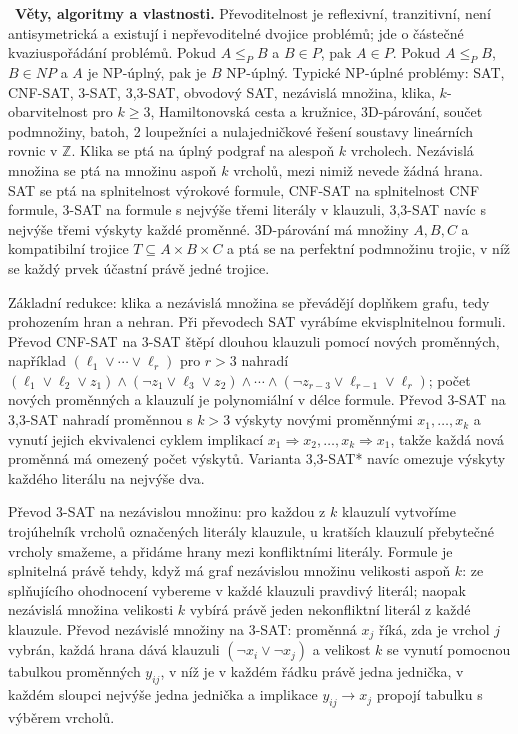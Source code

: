 \begin{odpoved}
\noindent{}\ \textbf{Věty, algoritmy a vlastnosti.}
Převoditelnost je reflexivní, tranzitivní, není antisymetrická a existují i
nepřevoditelné dvojice problémů; jde o částečné kvaziuspořádání problémů. Pokud
$A\le_P B$ a $B\in P$, pak $A\in P$. Pokud $A\le_P B$, $B\in NP$ a $A$ je NP-úplný,
pak je $B$ NP-úplný. Typické NP-úplné problémy: SAT, CNF-SAT, 3-SAT, 3,3-SAT,
obvodový SAT, nezávislá množina, klika, $k$-obarvitelnost pro $k\ge3$, Hamiltonovská
cesta a kružnice, 3D-párování, součet podmnožiny, batoh, 2 loupežníci a nulajedničkové
řešení soustavy lineárních rovnic v $\mathbb Z$. Klika se ptá na úplný podgraf na
alespoň $k$ vrcholech. Nezávislá množina se ptá na množinu aspoň $k$ vrcholů, mezi
nimiž nevede žádná hrana. SAT se ptá na splnitelnost výrokové formule, CNF-SAT na splnitelnost CNF formule, 3-SAT na formule s
nejvýše třemi literály v klauzuli, 3,3-SAT navíc s nejvýše třemi výskyty každé proměnné.
3D-párování má množiny $A,B,C$ a kompatibilní trojice $T\subseteq A\times B\times C$ a
ptá se na perfektní podmnožinu trojic, v níž se každý prvek účastní právě jedné trojice.

Základní redukce: klika a nezávislá množina se převádějí doplňkem grafu, tedy prohozením
hran a nehran. Při převodech SAT vyrábíme ekvisplnitelnou formuli. Převod CNF-SAT na 3-SAT
štěpí dlouhou klauzuli pomocí nových proměnných, například
$(\ell_1\lor\cdots\lor\ell_r)$ pro $r>3$ nahradí
$(\ell_1\lor\ell_2\lor z_1)\land(\neg z_1\lor\ell_3\lor z_2)\land\cdots\land
(\neg z_{r-3}\lor\ell_{r-1}\lor\ell_r)$; počet nových proměnných a klauzulí je polynomiální v délce formule. Převod 3-SAT na
3,3-SAT nahradí proměnnou s $k>3$ výskyty novými proměnnými $x_1,\ldots,x_k$ a
vynutí jejich ekvivalenci cyklem implikací
$x_1\Rightarrow x_2,\ldots,x_k\Rightarrow x_1$, takže každá nová proměnná má omezený
počet výskytů. Varianta 3,3-SAT* navíc omezuje výskyty každého literálu na nejvýše dva.

Převod 3-SAT na nezávislou množinu: pro každou z $k$ klauzulí vytvoříme trojúhelník
vrcholů označených literály klauzule, u kratších klauzulí přebytečné vrcholy smažeme,
a přidáme hrany mezi konfliktními literály. Formule je splnitelná právě tehdy, když má
graf nezávislou množinu velikosti aspoň $k$: ze splňujícího ohodnocení vybereme v každé
klauzuli pravdivý literál; naopak nezávislá množina velikosti $k$ vybírá právě jeden
nekonfliktní literál z každé klauzule. Převod nezávislé množiny na 3-SAT: proměnná
$x_j$ říká, zda je vrchol $j$ vybrán, každá hrana dává klauzuli
$(\neg x_i\lor\neg x_j)$ a velikost $k$ se vynutí pomocnou tabulkou proměnných
$y_{ij}$, v níž je v každém řádku právě jedna jednička, v každém sloupci nejvýše jedna
jednička a implikace $y_{ij}\to x_j$ propojí tabulku s výběrem vrcholů.


\end{odpoved}
